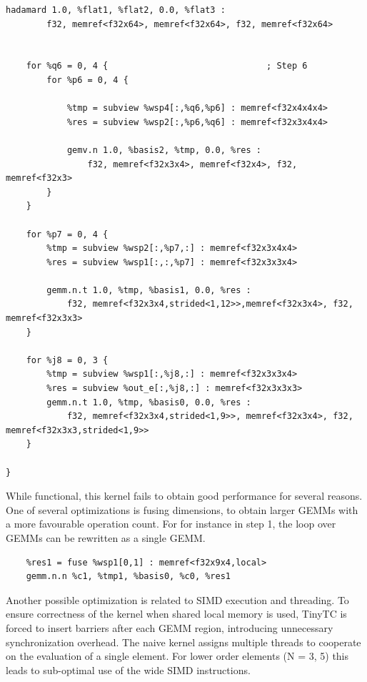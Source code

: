 \documentclass[a4paper,12pt]{article}
\begin{document}
\begin{lstlisting}[language=TensorIR,caption={BK1 using Tensor IR},basicstyle=\ttfamily\tiny]
    hadamard 1.0, %flat1, %flat2, 0.0, %flat3 :
        f32, memref<f32x64>, memref<f32x64>, f32, memref<f32x64>


    for %q6 = 0, 4 {                               ; Step 6
        for %p6 = 0, 4 {
            
            %tmp = subview %wsp4[:,%q6,%p6] : memref<f32x4x4x4>
            %res = subview %wsp2[:,%p6,%q6] : memref<f32x3x4x4>
             
            gemv.n 1.0, %basis2, %tmp, 0.0, %res :
                f32, memref<f32x3x4>, memref<f32x4>, f32, memref<f32x3> 
        }
    }

    for %p7 = 0, 4 {
        %tmp = subview %wsp2[:,%p7,:] : memref<f32x3x4x4>
        %res = subview %wsp1[:,:,%p7] : memref<f32x3x3x4>
        
        gemm.n.t 1.0, %tmp, %basis1, 0.0, %res :
            f32, memref<f32x3x4,strided<1,12>>,memref<f32x3x4>, f32, memref<f32x3x3>
    }

    for %j8 = 0, 3 {
        %tmp = subview %wsp1[:,%j8,:] : memref<f32x3x3x4>
        %res = subview %out_e[:,%j8,:] : memref<f32x3x3x3>
        gemm.n.t 1.0, %tmp, %basis0, 0.0, %res :
            f32, memref<f32x3x4,strided<1,9>>, memref<f32x3x4>, f32, memref<f32x3x3,strided<1,9>>
    }
    
}
\end{lstlisting}

While functional, this kernel fails to obtain good performance for several reasons.
One of several optimizations is fusing dimensions, to obtain larger GEMMs with a more favourable operation count. For for instance in step 1, the loop over GEMMs can be rewritten as a single GEMM.

\begin{lstlisting}[language=TensorIR,caption={BK1 using Tensor IR},basicstyle=\ttfamily\tiny]
    %tmp1 = fuse %in_e[0,1] : memref<f32x9x3>
    %res1 = fuse %wsp1[0,1] : memref<f32x9x4,local>    
    gemm.n.n %c1, %tmp1, %basis0, %c0, %res1
\end{lstlisting}

Another possible optimization is related to SIMD execution and threading.
To ensure correctness of the kernel when shared local memory is used, TinyTC is forced to insert barriers
after each GEMM region, introducing unnecessary synchronization overhead. The naive kernel assigns multiple threads to cooperate on the evaluation of a single element. For lower order elements (N = 3, 5) this leads to sub-optimal use of the wide SIMD instructions.
\end{document}
